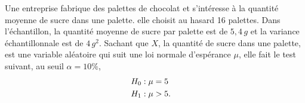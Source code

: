 \begin{questions}
\vspace{0.5cm}

 \question\label{1FQCM}

Une entreprise fabrique des palettes de chocolat et s'intéresse à la quantité moyenne de sucre dans une palette.  elle choisit au hasard 16 palettes. Dans l'échantillon, la quantité moyenne de sucre par palette est de $5,4 \,g$ et la variance échantillonnale est de $4 \, g^2$. Sachant que $X$, la quantité de sucre dans une palette, est une variable aléatoire qui suit une loi normale d'espérance $\mu$, elle fait le test suivant, au seuil $\alpha=10\%$,
\begin{align*}
	H_0 &: \mu = 5 \cr
	H_1 &: \mu > 5.
\end{align*}


\end{questions}
